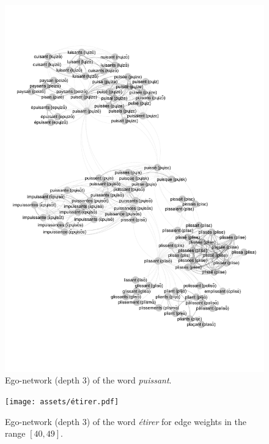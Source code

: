 \begin{figure}[H]
    \centering
    \includegraphics[width=\linewidth, trim=1cm 3.4cm 0.5cm 3.2cm, clip]{assets/puissant-ego.pdf}
    \caption{Ego-network (depth 3) of the word \textit{puissant}.}
    \label{fig:puissant-ego}
\end{figure}

\begin{figure}[H]
    \centering
    \texttt{[image: assets/étirer.pdf]}
    \caption{Ego-network (depth 3) of the word \textit{étirer} for edge weights in the range $[40,49]$.}
    \label{fig:etirer-ego}
\end{figure}

\vfill\null

